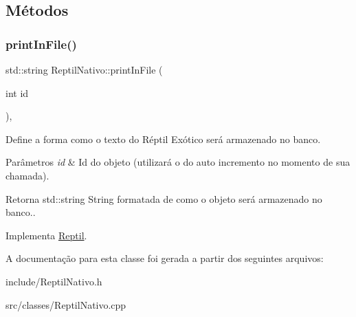 \subsection{Métodos}
\mbox{\label{classReptilNativo_ac801a11c87a2847fb4b46488aa6bb789}} 
\subsubsection{\texorpdfstring{print\+In\+File()}{printInFile()}}
{\footnotesize\ttfamily std\+::string Reptil\+Nativo\+::print\+In\+File (\begin{DoxyParamCaption}\item[{int}]{id }\end{DoxyParamCaption})\hspace{0.3cm}{\ttfamily [protected]}, {\ttfamily [virtual]}}



Define a forma como o texto do Réptil Exótico será armazenado no banco. 


\begin{DoxyParams}{Parâmetros}
{\em id} & Id do objeto (utilizará o do auto incremento no momento de sua chamada). \\
\hline
\end{DoxyParams}
\begin{DoxyReturn}{Retorna}
std\+::string String formatada de como o objeto será armazenado no banco.. 
\end{DoxyReturn}


Implementa \hyperlink{classReptil_a53fd59f3aed9c2d463722a8e97401406}{Reptil}.



A documentação para esta classe foi gerada a partir dos seguintes arquivos\+:\begin{DoxyCompactItemize}
\item 
include/Reptil\+Nativo.\+h\item 
src/classes/Reptil\+Nativo.\+cpp\end{DoxyCompactItemize}
